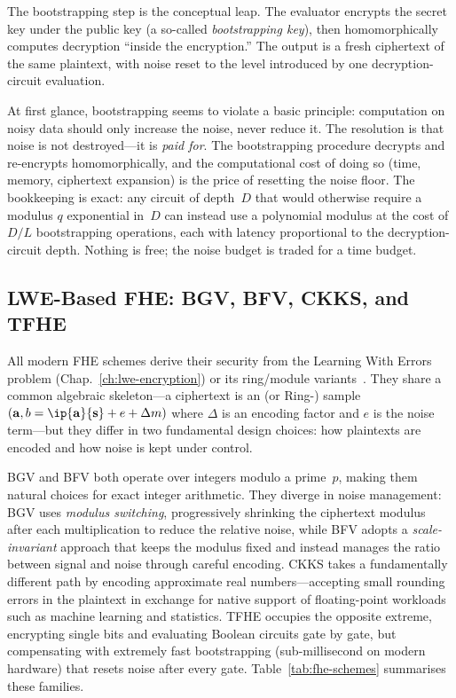 The bootstrapping step is the conceptual leap.  The evaluator encrypts the secret key under the public key (a so-called \emph{bootstrapping key}), then homomorphically computes decryption ``inside the encryption.''  The output is a fresh ciphertext of the same plaintext, with noise reset to the level introduced by one decryption-circuit evaluation.

At first glance, bootstrapping seems to violate a basic principle: computation on noisy data should only increase the noise, never reduce it.  The resolution is that noise is not destroyed---it is \emph{paid for}.  The bootstrapping procedure decrypts and re-encrypts homomorphically, and the computational cost of doing so (time, memory, ciphertext expansion) is the price of resetting the noise floor.  The bookkeeping is exact: any circuit of depth~$D$ that would otherwise require a modulus $q$ exponential in~$D$ can instead use a polynomial modulus at the cost of $D/L$ bootstrapping operations, each with latency proportional to the decryption-circuit depth.  Nothing is free; the noise budget is traded for a time budget.


\subsection{LWE-Based FHE: BGV, BFV, CKKS, and TFHE}
\label{subsec:fhe-schemes}

All modern FHE schemes derive their security from the Learning With Errors problem (Chap.~\ref{ch:lwe-encryption}) or its ring/module variants~\cite{Regev2009}.  They share a common algebraic skeleton---a ciphertext is an \lwe{} (or Ring-\lwe{}) sample $(\mathbf{a}, b = \ip{\mathbf{a}}{\mathbf{s}} + e + \Delta m)$ where $\Delta$ is an encoding factor and $e$ is the noise term---but they differ in two fundamental design choices: how plaintexts are encoded and how noise is kept under control.

BGV and BFV both operate over integers modulo a prime~$p$, making them natural choices for exact integer arithmetic.  They diverge in noise management: BGV uses \emph{modulus switching}, progressively shrinking the ciphertext modulus after each multiplication to reduce the relative noise, while BFV adopts a \emph{scale-invariant} approach that keeps the modulus fixed and instead manages the ratio between signal and noise through careful encoding.  CKKS takes a fundamentally different path by encoding approximate real numbers---accepting small rounding errors in the plaintext in exchange for native support of floating-point workloads such as machine learning and statistics.  TFHE occupies the opposite extreme, encrypting single bits and evaluating Boolean circuits gate by gate, but compensating with extremely fast bootstrapping (sub-millisecond on modern hardware) that resets noise after every gate.  Table~\ref{tab:fhe-schemes} summarises these families.

